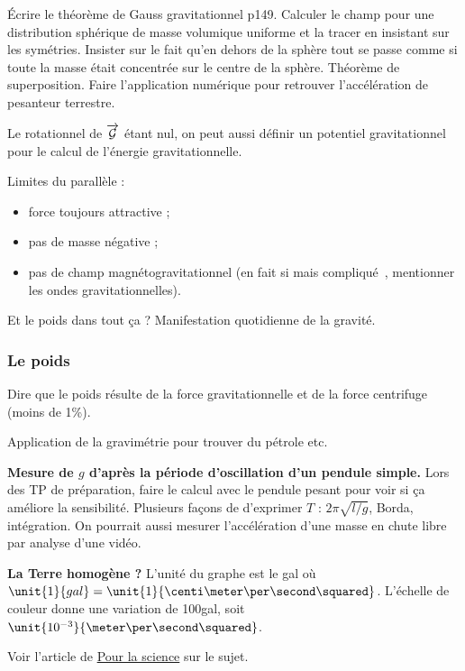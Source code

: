 Écrire le théorème de Gauss gravitationnel \cite{Faroux1996} p149.
Calculer le champ pour une distribution sphérique de masse volumique uniforme et la tracer en insistant sur les symétries.
Insister sur le fait qu'en dehors de la sphère tout se passe comme si toute la masse était concentrée sur le centre de la sphère.
Théorème de superposition.
Faire l'application numérique pour retrouver l'accélération de pesanteur terrestre.
\begin{remarque}
Le rotationnel de $\overrightarrow{\cal{G}}$ étant nul, on peut aussi définir un potentiel gravitationnel pour le calcul de l'énergie gravitationnelle.
\end{remarque}

Limites du parallèle :
\begin{itemize}
\item force toujours attractive ;
\item pas de masse négative ;
\item pas de champ magnétogravitationnel (en fait si mais compliqué~\cite{Mashhoon2007}, mentionner les ondes gravitationnelles).
\end{itemize}

\begin{transition}
Et le poids dans tout ça ?
Manifestation quotidienne de la gravité.
\end{transition}

\subsubsection{Le poids}

Dire que le poids résulte de la force gravitationnelle et de la force centrifuge (moins de 1\%).

Application de la gravimétrie pour trouver du pétrole etc.

\begin{experience}
\textbf{Mesure de $g$ d'après la période d'oscillation d'un pendule simple.}
Lors des TP de préparation, faire le calcul avec le pendule pesant pour voir si ça améliore la sensibilité.
Plusieurs façons de d'exprimer $T$ : $2\pi\sqrt{l/g}$, Borda, intégration.
On pourrait aussi mesurer l'accélération d'une masse en chute libre par analyse d'une vidéo.
\end{experience}

\begin{slide}
\textbf{La Terre homogène ?}
L'unité du graphe est le gal où $\unit{1}{gal} = \unit{1}{\centi\meter\per\second\squared}$.
L'échelle de couleur donne une variation de \unit{100}{\milli gal}, soit $\unit{10^{-3}}{\meter\per\second\squared}$.

\noindent
Voir l'article de \href{https://www.pourlascience.fr/sd/geosciences/la-gravite-observee-depuis-lespace-1153.php}{Pour la science} sur le sujet.
\end{slide}


